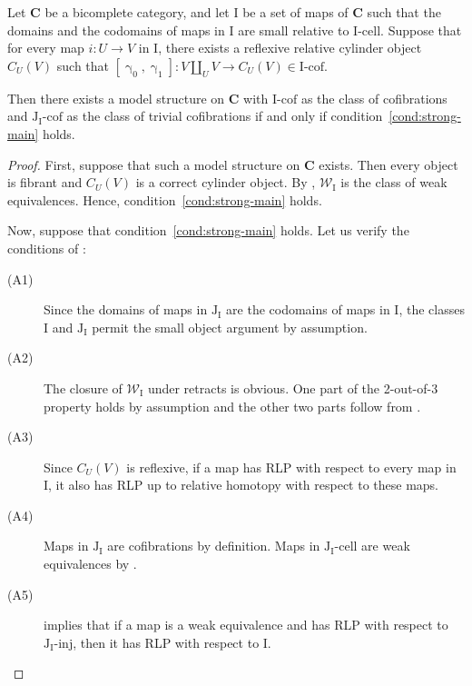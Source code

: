 \documentclass{tac}
\theoremstyle{definition}
\newcommand{\we}{\mathcal{W}}
\newcommand{\cat}[1]{\mathbf{#1}}
\newcommand{\C}{\cat{C}}
\newcommand{\I}{\mathrm{I}}
\newcommand{\J}{\mathrm{J}}
\newcommand{\class}[2]{#1\text{-}\mathrm{#2}}
\newcommand{\Iinj}[1][\I]{\class{#1}{inj}}
\newcommand{\Icell}[1][\I]{\class{#1}{cell}}
\newcommand{\Icof}[1][\I]{\class{#1}{cof}}
\newcommand{\Jinj}[1][]{\Iinj[\J#1]}
\newcommand{\Jcell}[1][]{\Icell[\J#1]}
\newcommand{\Jcof}[1][]{\Icof[\J#1]}
\newcommand{\cyli}{\upgamma}
\begin{document}
\begin{thm}[main]
Let $\C$ be a bicomplete category, and let $\I$ be a set of maps of $\C$ such that the domains and the codomains of maps in $\I$ are small relative to $\Icell$.
Suppose that for every map $i : U \to V$ in $\I$, there exists a reflexive relative cylinder object $C_U(V)$ such that $[\cyli_0,\cyli_1] : V \amalg_U V \to C_U(V) \in \Icof$.

Then there exists a model structure on $\C$ with $\Icof$ as the class of cofibrations and $\Jcof[_\I]$ as the class of trivial cofibrations
if and only if condition~\eqref{cond:strong-main} holds.
\end{thm}
\begin{proof}
First, suppose that such a model structure on $\C$ exists.
Then every object is fibrant and $C_U(V)$ is a correct cylinder object.
By , $\we_\I$ is the class of weak equivalences.
Hence, condition~\eqref{cond:strong-main} holds.

Now, suppose that condition~\eqref{cond:strong-main} holds.
Let us verify the conditions of :
\begin{description}
\item[(A1)] Since the domains of maps in $\J_\I$ are the codomains of maps in $\I$, the classes $\I$ and $\J_\I$ permit the small object argument by assumption.
\item[(A2)] The closure of $\we_\I$ under retracts is obvious.
One part of the 2-out-of-3 property holds by assumption and the other two parts follow from .
\item[(A3)] Since $C_U(V)$ is reflexive, if a map has RLP with respect to every map in $\I$, it also has RLP up to relative homotopy with respect to these maps.
\item[(A4)] Maps in $\J_\I$ are cofibrations by definition. Maps in $\Jcell[_\I]$ are weak equivalences by .
\item[(A5)]  implies that if a map is a weak equivalence and has RLP with respect to $\Jinj[_\I]$, then it has RLP with respect to $\I$.
\end{description}
\end{proof}
\end{document}
